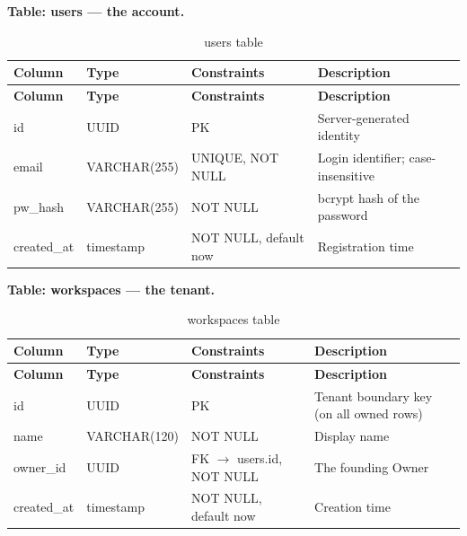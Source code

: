 \documentclass[12pt,a4paper]{report}
\begin{document}
\noindent\textbf{Table: users --- the account.}

\begingroup
\setlength{\parskip}{0pt}\renewcommand{\arraystretch}{1.32}\footnotesize
\begin{xltabular}{\textwidth}{>{\hsize\raggedright\arraybackslash}X >{\hsize\raggedright\arraybackslash}X >{\hsize\raggedright\arraybackslash}X >{\hsize\raggedright\arraybackslash}X}
\caption{users table}\\
\toprule
\textbf{Column} & \textbf{Type} & \textbf{Constraints} & \textbf{Description} \\
\midrule\endfirsthead
\toprule
\textbf{Column} & \textbf{Type} & \textbf{Constraints} & \textbf{Description} \\
\midrule\endhead
\bottomrule\endfoot
id & UUID & PK & Server-generated identity \\
email & VARCHAR(255) & UNIQUE, NOT NULL & Login identifier; case-insensitive \\
pw\_hash & VARCHAR(255) & NOT NULL & bcrypt hash of the password \\
created\_at & timestamp & NOT NULL, default now & Registration time \\
\end{xltabular}
\endgroup

\noindent\textbf{Table: workspaces --- the tenant.}

\begingroup
\setlength{\parskip}{0pt}\renewcommand{\arraystretch}{1.32}\footnotesize
\begin{xltabular}{\textwidth}{>{\hsize\raggedright\arraybackslash}X >{\hsize\raggedright\arraybackslash}X >{\hsize\raggedright\arraybackslash}X >{\hsize\raggedright\arraybackslash}X}
\caption{workspaces table}\\
\toprule
\textbf{Column} & \textbf{Type} & \textbf{Constraints} & \textbf{Description} \\
\midrule\endfirsthead
\toprule
\textbf{Column} & \textbf{Type} & \textbf{Constraints} & \textbf{Description} \\
\midrule\endhead
\bottomrule\endfoot
id & UUID & PK & Tenant boundary key (on all owned rows) \\
name & VARCHAR(120) & NOT NULL & Display name \\
owner\_id & UUID & FK $\rightarrow$ users.id, NOT NULL & The founding Owner \\
created\_at & timestamp & NOT NULL, default now & Creation time \\
\end{xltabular}
\endgroup
\end{document}
